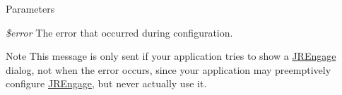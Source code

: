 \begin{DoxyParams}{Parameters}
\item[{\em \$error}]The error that occurred during configuration.\end{DoxyParams}
\begin{DoxyNote}{Note}
This message is only sent if your application tries to show a \hyperlink{interface_j_r_engage}{JREngage} dialog, not when the error occurs, since your application may preemptively configure \hyperlink{interface_j_r_engage}{JREngage}, but never actually use it. 
\end{DoxyNote}
